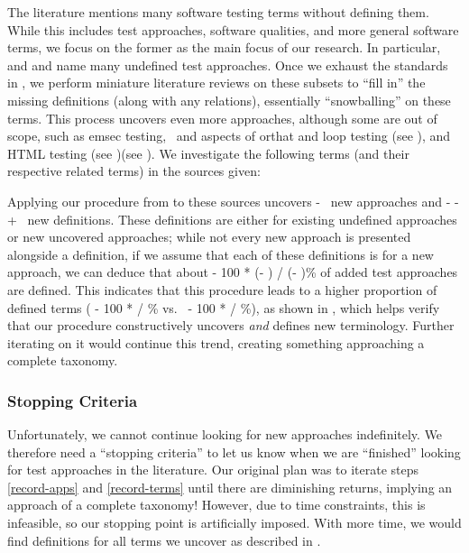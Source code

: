 The literature mentions many software testing terms without defining them.
While this includes test approaches, software qualities, and more general
software terms, we focus on the former as the main focus of our research.
In particular, \ifnotpaper \citet{IEEE2022} and \citet{Firesmith2015} \else
    \cite{Firesmith2015} and \cite{IEEE2022} \fi name many undefined test
approaches. Once we exhaust the standards in , we
perform miniature literature reviews on these subsets to ``fill in'' the
missing definitions (along with any relations), essentially ``snowballing''
on these terms. This process uncovers even more approaches, although some are
out of scope, such as \acf{emsec} testing\ifnotpaper, \else\ and \fi
aspects of \acf{orthat} \ifnotpaper and loop testing (see ),
    and HTML testing (see )\else (see )\fi.
We investigate the following terms (and their respective related terms) in the
sources given:


\label{iter-undef}
Applying our procedure from  to these sources uncovers
\the\numexpr \TotalAfter - \TotalBefore\relax\ new approaches and
\the\numexpr \TotalAfter - \UndefAfter - \TotalBefore + \UndefBefore\relax\ new
definitions. These definitions are either for existing undefined approaches or
new uncovered approaches; while not every new approach is presented alongside
a definition, if we assume that each of these definitions is for a new approach,
we can deduce that about \the{} - 100 * (\UndefAfter - \UndefBefore) /
(\TotalAfter - \TotalBefore)\relax\% of added test approaches are defined. This
indicates that this procedure leads to a higher proportion of defined terms
(\the{} - 100 * \UndefBefore / \TotalBefore\relax\% vs.~%
\the{} - 100 * \UndefAfter / \TotalAfter\relax\%), as shown in
, which helps verify that our procedure constructively
uncovers \emph{and} defines new terminology. Further iterating on it would
continue this trend, creating something approaching a complete taxonomy.

\ifnotpaper
    
\fi

\subsubsection{Stopping Criteria}\label{stop-crit}

Unfortunately, we cannot continue looking for new approaches indefinitely. We
therefore need a ``stopping criteria'' to let us know when we are ``finished''
looking for test approaches in the literature. Our original plan was to iterate
steps \ref{record-apps} and \ref{record-terms} until there are diminishing
returns, implying an approach of a complete taxonomy! However, due to time
constraints, this is infeasible, so our stopping point is artificially imposed.
With more time, we would find definitions for all terms we uncover as described
in .

